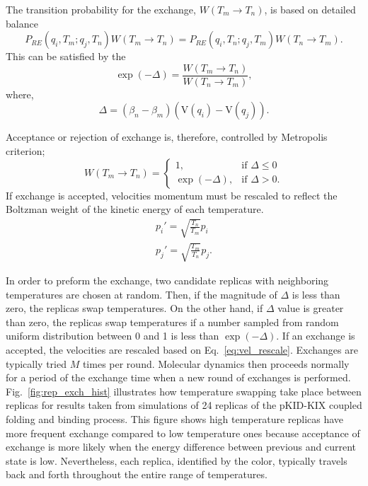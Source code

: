 \documentclass[../talant.diss.submit.tex]{subfiles}
\begin{document}
The transition probability for  the exchange, $W(T_m \rightarrow T_n)$, is
based on detailed balance
%
\begin{equation}
  \label{eq:det_bal}
  P_{RE}(q_i,T_{m};q_j,T_n) W(T_m \rightarrow T_n) =
  P_{RE}(q_i,T_{n};q_j,T_{m}) W(T_n \rightarrow T_m).
\end{equation}
%
%
This can be satisfied by the
%
%
\begin{equation}
  \label{eq:det_bal1}
  \exp(-\Delta) = \frac{W(T_m \rightarrow T_n)}{ W(T_n \rightarrow T_m)},
\end{equation}
%
%
where,
%
%
\begin{equation}
  \label{eq:det_bal2}
  \Delta = (\beta_n - \beta_m) (\mathrm{V}(q_i) - \mathrm{V}(q_j)). 
\end{equation}
%
%

Acceptance or rejection of exchange is, therefore, controlled by Metropolis criterion;
%
%
\begin{equation}
  W(T_m \rightarrow T_n) =
  \begin{cases}
    1, & \mbox{if  }  \Delta \leq 0 \\
    \exp(-\Delta), & \mbox{if  } \Delta > 0.
  \end{cases}
\end{equation}  
%
%
If exchange is accepted, velocities momentum must be rescaled to reflect the Boltzman
weight of the kinetic energy of each temperature.
%
\begin{align}
  \label{eq:vel_rescale}
  p_i' = \sqrt{\frac{T_n}{T_m}} p_i\\ 
  p_j' = \sqrt{\frac{T_m}{T_n}}p_j. 
\end{align}
%
%

In order to preform the exchange, two candidate replicas with neighboring temperatures
are chosen at random. 
Then, if the magnitude of $\Delta$
is less than zero, the replicas swap temperatures. On the other hand, if $\Delta$ value is
greater than zero, the replicas swap temperatures if a number sampled from random uniform
distribution between 0 and 1 is less than $\exp(-\Delta)$. If an exchange is accepted,
the velocities are rescaled based on Eq.~\ref{eq:vel_rescale}. Exchanges are typically
tried $M$ times per round. Molecular dynamics then proceeds normally for a period of the
exchange time when a new round of exchanges is performed. 
Fig.~\ref{fig:rep_exch_hist} illustrates how temperature swapping take place
between replicas for results taken from simulations of 24 replicas of the pKID-KIX
coupled folding and binding process.
This figure shows high temperature replicas have more frequent exchange compared to
low temperature ones because acceptance of exchange is more likely when the energy
difference between previous and current state is low. Nevertheless, each replica,
identified by the color, typically travels back and forth throughout the entire range of temperatures.
        
\end{document}
